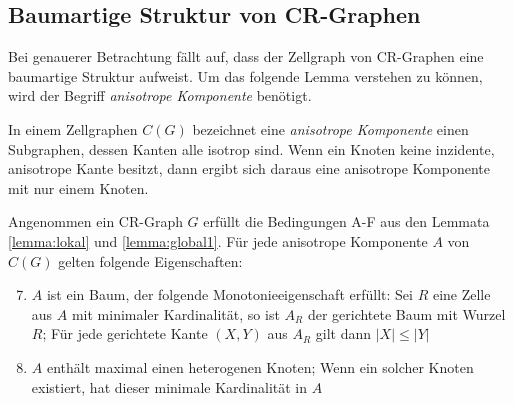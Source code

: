 \subsection{Baumartige Struktur von CR-Graphen}
Bei genauerer Betrachtung fällt auf, dass der Zellgraph von CR-Graphen eine baumartige Struktur aufweist.
Um das folgende Lemma verstehen zu können, wird der Begriff \emph{anisotrope Komponente} benötigt.
\begin{Definition}
	In einem Zellgraphen $C(G)$ bezeichnet eine \emph{anisotrope Komponente} einen Subgraphen, dessen Kanten alle isotrop sind.
	Wenn ein Knoten keine inzidente, anisotrope Kante besitzt, dann ergibt sich daraus eine anisotrope Komponente mit nur einem Knoten.
\end{Definition}

\begin{Lemma}
	Angenommen ein CR-Graph $G$ erfüllt die Bedingungen A-F aus den Lemmata \ref{lemma:lokal} und \ref{lemma:global1}.
	Für jede anisotrope Komponente $A$ von $C(G)$ gelten folgende Eigenschaften:
	
	\begin{enumerate}[label=(\Alph*)]
		\setcounter{enumi}{6}
		\item $A$ ist ein Baum, der folgende Monotonieeigenschaft erfüllt: Sei $R$ eine Zelle aus $A$ mit minimaler Kardinalität, so ist $A_R$ der gerichtete Baum mit Wurzel $R$; Für jede gerichtete Kante $(X,Y)$ aus $A_R$ gilt dann $|X|\leq |Y|$
		\item $A$ enthält maximal einen heterogenen Knoten; Wenn ein solcher Knoten existiert, hat dieser minimale Kardinalität in $A$
	\end{enumerate}
	\label{lemma:global2}
\end{Lemma}

